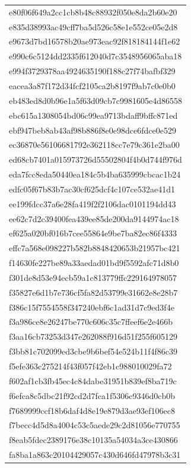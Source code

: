 \begin{tabular}{l}
e80f06f649a2cc1cb8b48c88932f050e8da2b60e20 \\
e835d38993ac49cff7ba5d526c58e1e552ce05e2d8 \\
e9673d7bd16578b20ae973eac92f818184144f1e62 \\
e990c6c5124dd2335f612040d7c3548956065aba18 \\
e994f3729378aa4924635190f188c27f74bafbf329 \\
eacea3a87f172d34fcf2105ca2b8197f9ab7c0e0b0 \\
eb483ed8d0b96e1a5f63d09cb7c9981605e4d86558 \\
ebc615a1308054bd06c99ea9713bdaff9bffc871ed \\
ebf947beb8ab43af98b886f8e0e98dce6fdce0e529 \\
ec36870e56106681792e362118cc7e79c361e2ba00 \\
ed68cb7401a015973726d55502804f4b0d744f976d \\
eda7fcc8eda50440ea184c5b4ba635999cbcac1b24 \\
edfc05f67b83b7ac30cf625dcf4c107ce532ae41d1 \\
ee199fdcc37a6e28fa419f2f2106dac0101194dd43 \\
ee62c7d2c39400fea439ee85de200da9144974ac18 \\
ef625a020bf016b7cee55864e9be7ba82ec86f4333 \\
effc7a568e098227b582b8848420653b21957bc421 \\
f14630fe227be89a33aedad01bd9f5592afc71d8b0 \\
f301de8d53e94ecb59a1c813779ffc229164978057 \\
f35827e6d1b7e736cf5fa82d53799e31662e8e28b7 \\
f386c15f7554558f347240ebf6c1ad31d7c9ed3f4e \\
f3a986ce8e26247be770c606c35c7ffeef6e2e466b \\
f3aa16cb73253d347e262088f916d51f255f605129 \\
f3bb81c702099ed3cbe9b6bef54e524b11f4f86c39 \\
f5efe363c275214f43f057f42eb1c988010029fa72 \\
f602af1cb3fb45ec4c84dabe31951b839ef8ba719c \\
f6efca8c5dbc21f92cd2d7fca1f5306c9346d0cb0b \\
f7689999ccf18b6daf4d8e19e879d3ae93ef106ec8 \\
f7becc4d5d8a4004c53c5aede29c2d81056e770755 \\
f8eab5fdec2389176e38c10135a54034a3ce430866 \\
fa8ba1a863c20104429057c430d646fd47978b3c31 \\

\end{tabular}
